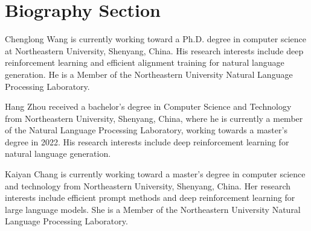 \section{Biography Section}
\vspace{-8mm}

\begin{IEEEbiography}
{Chenglong Wang}
is currently working toward a Ph.D. degree in computer science at Northeastern University, Shenyang, China. His research interests include deep reinforcement learning and efficient alignment training for natural language generation. He is a Member of the Northeastern University Natural Language Processing Laboratory.
\end{IEEEbiography}
\vspace{-10mm}
\begin{IEEEbiography}
{Hang Zhou}
received a bachelor's degree in Computer Science and Technology from Northeastern University, Shenyang, China, where he is currently a member of the Natural Language Processing Laboratory, working towards a master’s degree in 2022. His research interests include deep reinforcement learning for natural language generation.
\end{IEEEbiography}
\vspace{-10mm}
\begin{IEEEbiography}
{Kaiyan Chang}
is currently working toward a master’s degree in computer science and technology from Northeastern University, Shenyang, China. Her research interests include efficient prompt methods and deep reinforcement learning for large language models. She is a Member of the Northeastern University Natural Language Processing Laboratory.
\end{IEEEbiography}
